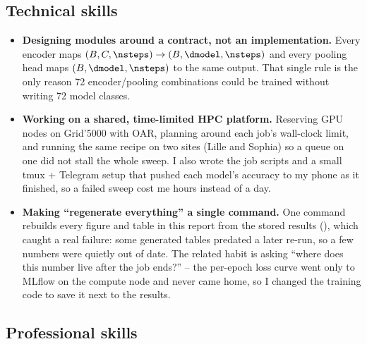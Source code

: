 \subsection{Technical skills}

\begin{itemize}\itemsep3pt
  \item \textbf{Designing modules around a contract, not an implementation.} Every encoder maps
        $(B, C, \nsteps) \to (B, \dmodel, \nsteps)$ and every pooling head maps
        $(B, \dmodel, \nsteps)$ to the same output. That single rule is the only reason 72
        encoder/pooling combinations could be trained without writing 72 model classes.

  \item \textbf{Working on a shared, time-limited HPC platform.} Reserving GPU nodes on Grid'5000
        with OAR, planning around each job's wall-clock limit, and running the same recipe on two
        sites (Lille and Sophia) so a queue on one did not stall the whole sweep. I also wrote the
        job scripts and a small tmux + Telegram setup that pushed each model's accuracy to my phone
        as it finished, so a failed sweep cost me hours instead of a day.

  \item \textbf{Making ``regenerate everything'' a single command.} One command rebuilds every
        figure and table in this report from the stored results (), which caught
        a real failure: some generated tables predated a later re-run, so a few numbers were quietly
        out of date. The related habit is asking ``where does this number live after the job ends?''
        -- the per-epoch loss curve went only to MLflow on the compute node and never came home, so
        I changed the training code to save it next to the results.
\end{itemize}

\subsection{Professional skills}

